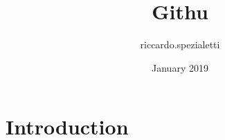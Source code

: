 \documentclass{article}
\title{Githu}
\author{riccardo.spezialetti }
\date{January 2019}
\begin{document}
\maketitle

\section{Introduction}
\end{document}

